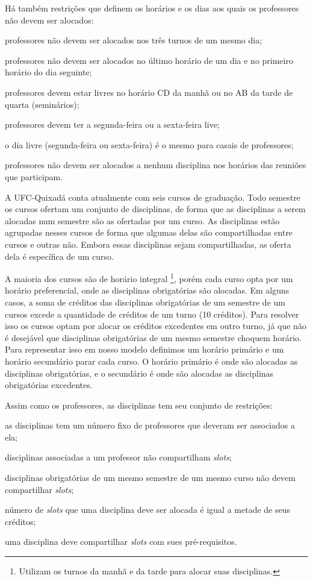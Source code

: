 Há também restrições que definem os horários e os dias aos quais os professores não devem ser alocados:

\begin{alineascomponto}
\item professores não devem ser alocados nos três turnos de um mesmo dia;
\item professores não devem ser alocados no último horário de um dia e no primeiro horário do dia seguinte;
\item professores devem estar livres no horário CD da manhã ou no AB da tarde de quarta (seminários);
\item professores devem ter a segunda-feira ou a sexta-feira live;
\item o dia livre (segunda-feira ou sexta-feira) é o mesmo para casais de professores;
\item professores não devem ser alocados a nenhum disciplina nos horários das reuniões que participam.
\end{alineascomponto}

A UFC-Quixadá conta atualmente com seis cursos de graduação. Todo semestre os cursos ofertam um conjunto de disciplinas, de forma que as disciplinas a serem alocadas num semestre são as ofertadas por um curso. As disciplinas estão agrupadas nesses cursos de forma que algumas delas são compartilhadas entre cursos e outras não. Embora essas disciplinas sejam compartilhadas, as oferta dela é específica de um curso. 

A maioria dos cursos são de horário integral \footnote{Utilizam os turnos da manhã e da tarde para alocar suas disciplinas.}, porém cada curso opta por um horário preferencial, onde as disciplinas obrigatórias são alocadas. Em alguns casos, a soma de créditos das disciplinas obrigatórias de um semestre de um cursos excede a quantidade de créditos de um turno (10 créditos). Para resolver isso os cursos optam por alocar os créditos excedentes em outro turno, já que não é desejável que disciplinas obrigatórias de um mesmo semestre choquem horário. Para representar isso em nosso modelo definimos um horário primário e um horário secundário parar cada curso. O horário primário é onde são alocadas as disciplinas obrigatórias, e o secundário é onde são alocadas as disciplinas obrigatórias excedentes. 

Assim como os professores, as disciplinas tem seu conjunto de restrições:

\begin{alineascomponto}
\item as disciplinas tem um número fixo de professores que deveram ser associados a ela;
\item disciplinas associadas a um professor não compartilham \textit{slots};
\item disciplinas obrigatórias de um mesmo semestre de um mesmo curso não devem compartilhar \textit{slots};
\item número de \textit{slots} que uma disciplina deve ser alocada é igual a metade de seus créditos;
\item uma disciplina deve compartilhar \textit{slots} com sues pré-requisitos.
\end{alineascomponto} 

